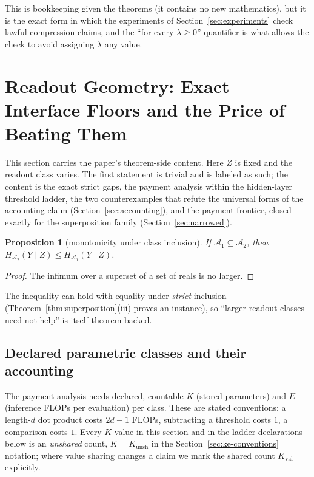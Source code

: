 \documentclass[twocolumn,10pt]{article}
\newtheorem{proposition}[theorem]{Proposition}
\theoremstyle{definition}
\theoremstyle{remark}
\newcommand{\cA}{\mathcal{A}}
\newcommand{\lamvar}{\lambda}
\newcommand{\Kunsh}{K_{\mathrm{unsh}}}
\newcommand{\Kval}{K_{\mathrm{val}}}
\begin{document}
This is bookkeeping given the theorems (it contains no new mathematics),
but it is the exact form in which the experiments of
Section~\ref{sec:experiments} check lawful-compression claims, and the
``for every $\lamvar \ge 0$'' quantifier is what allows the check to avoid
assigning $\lamvar$ any value.

\section{Readout Geometry: Exact Interface Floors and the Price of Beating Them}
\label{sec:readout}

This section carries the paper's theorem-side content. Here $Z$ is
fixed and the readout class varies. The first statement is trivial and
is labeled as such; the content is the exact strict gaps, the payment
analysis within the hidden-layer threshold ladder, the two
counterexamples that refute the universal forms of the accounting
claim (Section~\ref{sec:accounting}), and the payment frontier, closed
exactly for the superposition family (Section~\ref{sec:narrowed}).

\begin{proposition}[monotonicity under class inclusion]
\label{prop:monotone}
If $\cA_1 \subseteq \cA_2$, then
$H_{\cA_2}(Y \mid Z) \le H_{\cA_1}(Y \mid Z)$.
\end{proposition}

\begin{proof}
The infimum over a superset of a set of reals is no larger.
\end{proof}

The inequality can hold with equality under \emph{strict} inclusion
(Theorem~\ref{thm:superposition}(iii) proves an instance), so ``larger
readout classes need not help'' is itself theorem-backed.

\subsection{Declared parametric classes and their accounting}
\label{sec:classes}

The payment analysis needs declared, countable $K$ (stored parameters) and
$E$ (inference FLOPs per evaluation) per class. These are stated
conventions: a length-$d$ dot product costs $2d - 1$ FLOPs, subtracting a
threshold costs $1$, a comparison costs $1$. Every $K$ value in this
section and in the ladder declarations below is an \emph{unshared}
count, $K = \Kunsh$ in the Section~\ref{sec:ke-conventions} notation;
where value sharing changes a claim we mark the shared count $\Kval$
explicitly.
\end{document}
